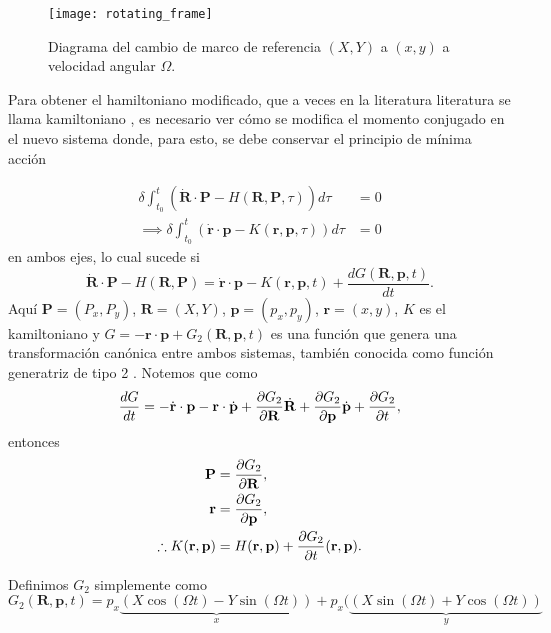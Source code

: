 \begin{figure}[h!]
 \centering
 \texttt{[image: rotating\_frame]}
 \caption{Diagrama del cambio de marco de referencia $(X,Y)$ a $(x,y)$ a velocidad angular $\Omega$.}
 \label{fig:rotating_frames}
\end{figure}

Para obtener el hamiltoniano modificado, que a veces en la literatura literatura se llama kamiltoniano \cite{Goldstein2007, Johns2011}, es necesario ver cómo se modifica el momento conjugado en el nuevo sistema donde, para esto, se debe conservar el principio de mínima acción

\begin{align}
 \delta \int_{t_0}^t \left( \dot{\mathbf{R}} \cdot \mathbf{P} - H(\mathbf{R}, \mathbf{P}, \tau) \right) d\tau &= 0 \nonumber \\
\implies \delta \int_{t_0}^t \left( \dot{\mathbf{r}} \cdot \mathbf{p} - K(\mathbf{r}, \mathbf{p}, \tau) \right) d\tau &= 0
 \label{eq:kamiltonian_condition}
\end{align}
en ambos ejes, lo cual sucede si
\begin{equation}
 \dot{\mathbf{R}} \cdot \mathbf{P} - H(\mathbf{R}, \mathbf{P}) = \dot{\mathbf{r}} \cdot \mathbf{p} - K(\mathbf{r}, \mathbf{p}, t) + \frac{dG(\mathbf{R}, \mathbf{p}, t)}{dt}.
\end{equation}
Aquí $\mathbf{P} = (P_x,P_y)$, $\mathbf{R} = (X,Y)$, $\mathbf{p} = (p_x,p_y)$, $\mathbf{r} = (x,y)$, $K$ es el kamiltoniano y $G = - \mathbf{r} \cdot \mathbf{p} + G_2(\mathbf{R}, \mathbf{p}, t)$ es una función que genera una transformación canónica entre ambos sistemas, también conocida como función generatriz de tipo 2 \cite{CanonicalTransformations}. Notemos que como 
\begin{align*}
 \frac{dG}{dt} =  - \dot{\mathbf{r}}\cdot \mathbf{p} - \mathbf{r}\cdot \dot{\mathbf{p}} + \frac{\partial G_2}{\partial \mathbf{R}}\dot{\mathbf{R}} + \frac{\partial G_2}{\partial \mathbf{p}}\dot{\mathbf{p}} + \frac{\partial G_2}{\partial t},
\end{align*}
entonces
\begin{align}
 \mathbf{P} &= \frac{\partial G_2}{\partial \mathbf{R}} \nonumber, \\
 \mathbf{r} &= \frac{\partial G_2}{\partial \mathbf{p}} \nonumber, \\
 \therefore K(\mathbf{r}, \mathbf{p}) &= H(\mathbf{r}, \mathbf{p}) + \frac{\partial G_2}{\partial t} (\mathbf{r}, \mathbf{p}).
 \label{eq:kamiltonian_formulae}
\end{align}

Definimos $G_2$ simplemente como
\begin{equation}
 G_2(\mathbf{R}, \mathbf{p}, t) = p_x \underbrace{\left( X \cos (\Omega t) - Y \sin (\Omega t) \right) }_{x} + p_x (\underbrace{ \left( X \sin (\Omega t) + Y \cos (\Omega t) \right)}_{y}
 \label{eq:generating_function}
\end{equation}

